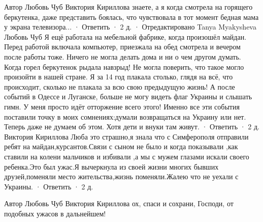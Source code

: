 \begin{itemize}
\begin{itemize}
Автор
Любовь Чуб
Виктория Кириллова знаете, а я когда смотрела на горящего беркутенка, даже представить боялась, что чувствовала в тот момент бедная мама у экрана телевизора...
 · Ответить · 2 д. · Отредактировано
Tanya Myakysheva
Любовь Чуб Я ещё работала на мебельной фабрике, когда произошёл майдан. Перед работой включала компьютер, приезжала на обед смотрела и вечером после работы тоже. Ничего не могла делать дома и ни о чем другом думать. Когда горел беркутенок рыдала навзрыд! Не могла поверить, что такое могло произойти в нашей стране. Я за 14 год плакала столько, глядя на всё, что происходит, сколько не плакала за всю свою предыдущую жизнь! А после событий в Одессе и Луганске, больше не могу видеть флаг Украины и слышать гимн. У меня просто идёт отторжение всего этого! Именно все эти события поставили точку в моих сомнениях:думали возвращаться на Украину или нет. Теперь даже не думаем об этом. Хотя дети и внуки там живут.
 · Ответить · 2 д.
Виктория Кириллова
Люба это страшно,я знала что с Симферополя отправили ребят на майдан,курсантов.Связи с сыном не было и когда показывали ,как ставили на колени мальчиков и избивали ,а мы с мужем глазами искали своего ребенка.Это был ужас.Я вычеркнула из своей жизни многих бывших друзей,поменяли место жительства,жизнь поменяли.Жалею что не уехали с Украины.
 · Ответить · 2 д.

Автор
Любовь Чуб
Виктория Кириллова ох, спаси и сохрани, Господи, от подобных ужасов в дальнейшем!
\end{itemize} %

\end{itemize} %
